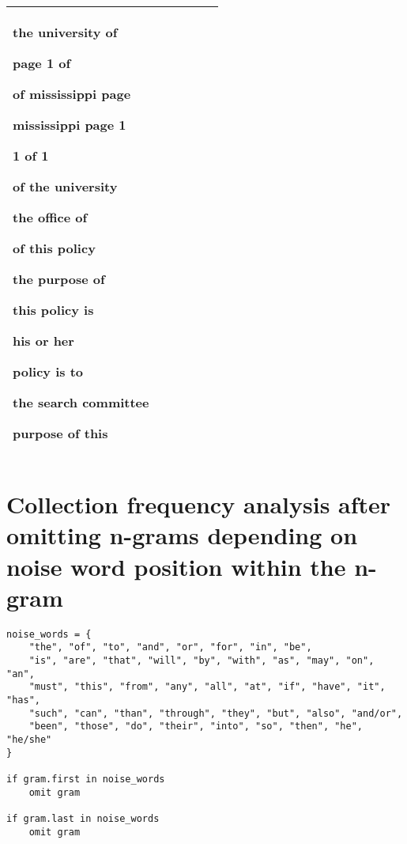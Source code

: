 \documentclass[a4paper,11pt]{article}
\theoremstyle{mytheor}
\begin{document}
\begin{tabular}{|*6{P{0.16}}|}
{\begin{tabitemize}
      \item the university of
      \item page 1 of
      \item of mississippi page
      \item mississippi page 1
      \item 1 of 1
      \item of the university
      \item the office of
      \item of this policy
      \item the purpose of
      \item this policy is
      \item his or her
      \item policy is to
      \item the search committee
      \item purpose of this
      \end{tabitemize}}\\ \hline
\end{tabular}

\section*{Collection frequency analysis after omitting n-grams depending on noise word position within the n-gram}

\begin{lstlisting}[label={list:second},caption=Omission of n-grams dependent on noise word position.]
noise_words = {
	"the", "of", "to", "and", "or", "for", "in", "be",
	"is", "are", "that", "will", "by", "with", "as", "may", "on", "an",
	"must", "this", "from", "any", "all", "at", "if", "have", "it", "has",
	"such", "can", "than", "through", "they", "but", "also", "and/or",
	"been", "those", "do", "their", "into", "so", "then", "he", "he/she"
}

if gram.first in noise_words
	omit gram
	
if gram.last in noise_words
	omit gram
\end{lstlisting}
\end{document}
